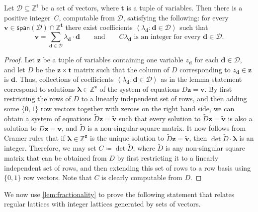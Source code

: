 \documentclass{theoretics}
\newcommand{\Dd}{\mathcal{D}}
\newcommand{\Z}{\mathbb{Z}}
\newcommand{\tup}[1]{{\mathbf{#1}}}
\newcommand{\zz}{\tup z}
\newcommand{\tv}{\tup t}
\newcommand{\dd}{\tup d}
\newcommand{\myvv}{\tup v} %
\newcommand{\mset}[1]{\left\langle #1\right\rangle}
\newcommand{\spn}{\mathsf{span}}
\begin{document}
\begin{lemma}\label{lem:fractionality}
 Let $\Dd\subseteq \Z^\tv$ be a set of vectors, where $\tv$ is a tuple of variables. Then there is a positive integer~$C$, computable from $\Dd$, satisfying the following: for every $\myvv\in \spn(\Dd)\cap \Z^\tv$ there exist coefficients $\mset{\lambda_\dd\colon \dd\in \Dd}$ such that
 $$\myvv=\sum_{\dd\in \Dd} \lambda_\dd\cdot \dd\qquad \textrm{and}\qquad C\lambda_\dd\textrm{ is an integer for every }\dd\in \Dd.$$
\end{lemma}
\begin{proof}
 Let $\zz$ be a tuple of variables containing one variable $z_\dd$ for each $\dd\in \Dd$, and let $D$ be the $\zz\times \tv$ matrix such that the column of $D$ corresponding to $z_\dd\in \zz$ is $\dd$. Thus, collections of coefficients $\mset{\lambda_\dd\colon \dd\in \Dd}$ as in the lemma statement correspond to solutions $\boldsymbol{\lambda}\in \Z^\zz$ of the system of equations $D\zz=\myvv$. By first restricting the rows of $D$ to a linearly independent set of rows, and then adding some $\{0,1\}$ row vectors together with zeroes on the right hand side, we can obtain a system of equations $\widetilde{D}\zz=\widetilde{\myvv}$ such that every solution to $\widetilde{D}\zz=\widetilde{\myvv}$ is also a solution to $D\zz=\myvv$, and $\widetilde{D}$ is a non-singular square matrix. It now follows from Cramer rules that if $\boldsymbol{\lambda}\in \Z^\zz$ is the unique solution to $\widetilde{D}\zz=\widetilde{\myvv}$, then $\det \widetilde{D}\cdot {\boldsymbol{\lambda}}$ is an integer. Therefore, we may set $C\coloneqq \det \widetilde{D}$, where $\widetilde{D}$ is any non-singular square matrix that can be obtained from $D$ by first restricting it to a linearly independent set of rows, and then extending this set of rows to a row basis using $\{0,1\}$ row vectors. Note that $C$ is clearly computable from $D$.
\end{proof}

We now use \cref{lem:fractionality} to prove the following statement that relates regular lattices with integer lattices generated by sets of vectors.
\end{document}
